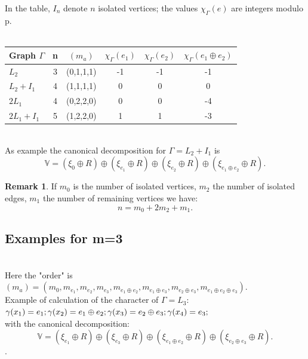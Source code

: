 \documentclass[preprint,12pt,authoryear]{elsarticle}
\theoremstyle{definition}
\newtheorem{rem}{Remark}
\begin{document}
In the table,  $I_n$ denote $n$ isolated vertices; the values $\chi_{\Gamma}(e)$ are integers modulo p.\\\\
\begin{center}
\renewcommand{\arraystretch}{1.2}
\begin{tabular}{|l|c|c|c|c|c|}
\hline
Graph $\Gamma$   & n  & $(m_a)$ & $\chi_{\Gamma}(e_1)$  & $\chi_{\Gamma}(e_2)$  & $\chi_{\Gamma}(e_1 \oplus e_2)$  \\
\hline 
$L_2$                      & 3  & (0,1,1,1) &             -1                      &                      -1             &             -1                       \\
\hline
$L_2+I_1$               & 4  & (1,1,1,1) &             0                        &                        0           &             0                         \\
\hline
$2L_1$                    & 4  & (0,2,2,0) &               0                        &                        0          &             -4                          \\
\hline
$2L_1+I_1$             & 5  & (1,2,2,0) &               1                       &                      1               &            -3                         \\
\hline
\end{tabular}
\end{center}\mbox{}\\


\noindent As example the canonical decomposition for $\Gamma= L_2+I_1$ is 
$$ \mathbb{V}= (\xi_0 \oplus R) \oplus (\xi_{e_1} \oplus R) \oplus (\xi_{e_2} \oplus R) \oplus (\xi_{e_1\oplus e_2} \oplus R).$$


\begin{rem} If $m_0$ is the number of isolated vertices, $m_2$ the number of isolated edges, $m_1$ the number of remaining vertices  we have:
\[
n=m_0 + 2m_2+ m_1.
\]
\end{rem}

\subsection{Examples for m=3} \mbox{}\\
Here the "order" is $(m_a)=(m_0,m_{e_1}, m_{e_2},m_{e_3}, m_{e_1\oplus e_2},  m_{e_1\oplus  e_3}, m_{e_2 \oplus  e_3}, m_{e_1\oplus e_2
\oplus e_3})$.\\
Example of calculation of the character of $\Gamma=L_3$:\\
$\gamma(x_1)=e_1;\\
\gamma(x_2)=e_1\oplus e_2;\\
\gamma(x_3)=e_2 \oplus e_3;\\
\gamma(x_4)= e_3;$\\
with the canonical decomposition: 
$$ \mathbb{V}= (\xi_{e_1} \oplus R) \oplus (\xi_{e_3} \oplus R) \oplus (\xi_{e_1\oplus e_2} \oplus R) \oplus  (\xi_{e_2\oplus e_3} \oplus R).$$.
\end{document}
